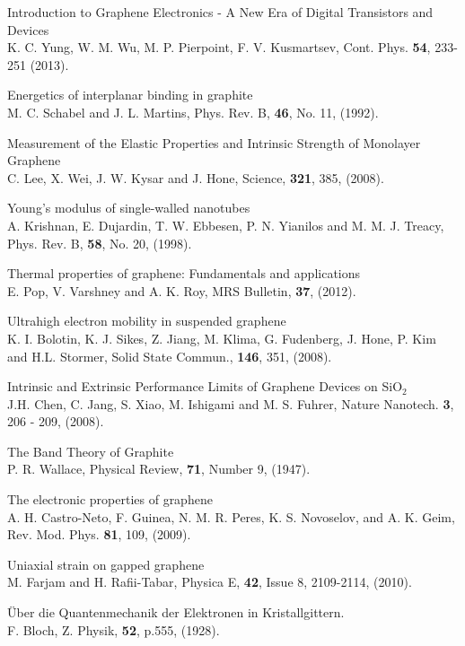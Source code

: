 \documentclass[12pt,a4paper]{report}
\begin{document}
\begin{thebibliography}{10}
 Introduction to Graphene Electronics - A New Era of Digital Transistors and Devices\\
K. C. Yung, W. M. Wu, M. P. Pierpoint, F. V. Kusmartsev,
Cont. Phys. {\bf 54}, 233-251 (2013).

Energetics of interplanar binding in graphite\\
M. C. Schabel and J. L. Martins,
Phys. Rev. B, {\bf 46}, No. 11, (1992).

Measurement of the Elastic Properties and Intrinsic Strength of Monolayer Graphene\\
C. Lee, X. Wei, J. W. Kysar and J. Hone,
Science, {\bf 321}, 385, (2008).

Young’s modulus of single-walled nanotubes\\
A. Krishnan, E. Dujardin, T. W. Ebbesen, P. N. Yianilos and M. M. J. Treacy,
Phys. Rev. B, {\bf 58}, No. 20, (1998).

Thermal properties of graphene: Fundamentals and applications\\
E. Pop, V. Varshney and A. K. Roy,
MRS Bulletin, {\bf 37}, (2012).

Ultrahigh electron mobility in suspended graphene\\
K. I. Bolotin, K. J. Sikes, Z. Jiang, M. Klima, G. Fudenberg, J. Hone, P. Kim and H.L. Stormer,
Solid State Commun., {\bf 146}, 351, (2008).

Intrinsic and Extrinsic Performance Limits of Graphene Devices on SiO$_{2}$\\
J.H. Chen, C. Jang, S. Xiao, M. Ishigami and M. S. Fuhrer,
Nature Nanotech. {\bf 3}, 206 - 209, (2008).

 The Band Theory of Graphite\\
P. R. Wallace,
Physical Review, {\bf 71}, Number 9, (1947).

	The electronic properties of graphene\\
A. H. Castro-Neto, F. Guinea, N. M. R. Peres, K. S. Novoselov, and A. K. Geim,
Rev. Mod. Phys. {\bf 81}, 109, (2009).

Uniaxial strain on gapped graphene\\
M. Farjam and H. Rafii-Tabar,
Physica E, {\bf 42}, Issue 8, 2109-2114, (2010).

 \"{U}ber die Quantenmechanik der Elektronen in Kristallgittern.\\
F. Bloch,
Z. Physik, {\bf 52}, p.555, (1928).


\end{thebibliography}
\end{document}
